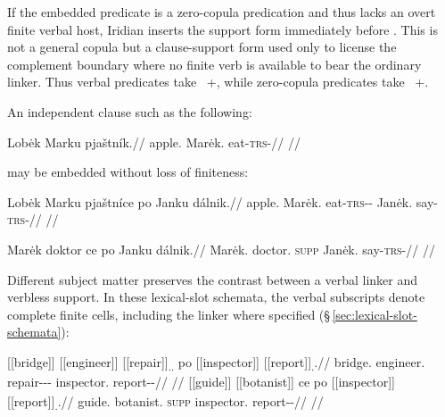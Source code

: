 If the embedded predicate is a zero-copula predication and thus lacks an overt
finite verbal host, Iridian inserts the support form  immediately
before . This  is not a general copula but a clause-support
form used only to license the complement boundary where no finite verb is
available to bear the ordinary linker. Thus verbal predicates take
~+, while zero-copula predicates take ~+.

An independent clause such as the following:

\ex
\begingl
\gla Lobėk Marku pjaštník.//
\glb apple.\Dir{} Marėk.\Trs{} eat-\textsc{trs}-\Pf{}//
\glft {}//
\endgl
\xe

may be embedded without loss of finiteness:

\ex
\begingl
\gla Lobėk Marku pjaštníce po Janku dálnik.//
\glb apple.\Dir{} Marėk.\Trs{} eat-\textsc{trs}-\Pf{}-\Lnk{} \Compl{} Janėk.\Trs{} say-\textsc{trs}-\Pf{}//
\glft {}//
\endgl
\xe

\ex
\begingl
\gla Marėk doktor ce po Janku dálnik.//
\glb Marėk.\Dir{} doctor.\Dir{} \textsc{supp} \Compl{} Janėk.\Trs{} say-\textsc{trs}-\Pf{}//
\glft {}//
\endgl
\xe

Different subject matter preserves the contrast between a verbal linker and
verbless support. In these lexical-slot schemata, the verbal subscripts denote
complete finite cells, including the linker where specified
(§\,\ref{sec:lexical-slot-schemata}):

\pex\label{ex:embedding-slot-hosts}
\a
\begingl
\gla \textnormal{[[bridge]]}\textsubscript{\Dir{}} \textnormal{[[engineer]]}\textsubscript{\Trs{}} \textnormal{[[repair]]}\textsubscript{\Trs{}.\Pf{}.\Lnk{}} po \textnormal{[[inspector]]}\textsubscript{\Trs{}} \textnormal{[[report]]}\textsubscript{\Trs{}.\Pf{}}.//
\glb bridge.\Dir{} engineer.\Trs{} repair-\Trs{}-\Pf{}-\Lnk{} \Compl{} inspector.\Trs{} report-\Trs{}-\Pf{}//
\glft {}
//
\endgl
\a
\begingl
\gla \textnormal{[[guide]]}\textsubscript{\Dir{}} \textnormal{[[botanist]]}\textsubscript{\Dir{}} ce po \textnormal{[[inspector]]}\textsubscript{\Trs{}} \textnormal{[[report]]}\textsubscript{\Trs{}.\Pf{}}.//
\glb guide.\Dir{} botanist.\Dir{} \textsc{supp} \Compl{} inspector.\Trs{} report-\Trs{}-\Pf{}//
\glft {}
//
\endgl
\xe

